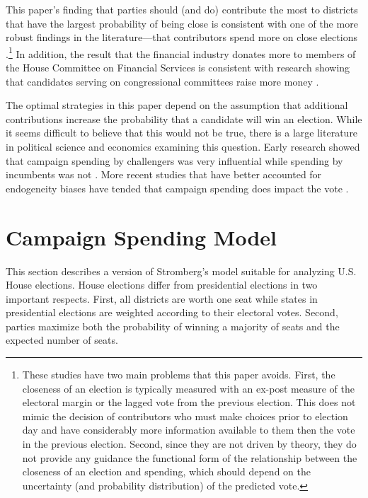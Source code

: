 \documentclass[12pt,final,fleqn]{article}
\theoremstyle{plain}
\begin{document}
This paper's finding that parties should (and do) contribute the most to districts that have the largest probability of being close is consistent with one of the more robust findings in the literature---that contributors spend more on close elections \citep{kau1982general, jacobson1985money, poole1985patterns, stratmann1991campaign}.\footnote{These studies have two main problems that this paper avoids. First, the closeness of an election is typically measured with an ex-post measure of the electoral margin or the lagged vote from the previous election. This does not mimic the decision of contributors who must make choices prior to election day and have considerably more information available to them then the vote in the previous election. Second, since they are not driven by theory, they do not provide any guidance the functional form of the relationship between the closeness of an election and spending, which should depend on the uncertainty (and probability distribution) of the predicted vote.} In addition, the result that the financial industry donates more to members of the House Committee on Financial Services is consistent with research showing that candidates serving on congressional committees raise more money \citep{grier1991committee, romer1994empirical, kroszner1998interest}.  

The optimal strategies in this paper depend on the assumption that additional contributions increase the probability that a candidate will win an election. While it seems difficult to believe that this would not be true, there is a large literature in political science and economics examining this question. Early research showed that campaign spending by challengers was very influential while spending by incumbents was not \citep{jacobson1978effects, jacobson1980money,jacobson1985money}. More recent studies that have better accounted for endogeneity biases have tended that campaign spending does impact the vote \citep{gerber1998estimating, green1988salvation,erikson2000equilibria}. 

\section{Campaign Spending Model}
This section describes a version of Stromberg's \citeyear{stromberg2008electoral} model suitable for analyzing U.S. House elections. House elections differ from presidential elections in two important respects. First, all districts are worth one seat while states in presidential elections are weighted according to their electoral votes. Second, parties maximize both the probability of winning a majority of seats and the expected number of seats. 
\end{document}
